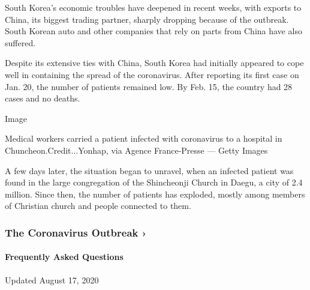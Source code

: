 South Korea's economic troubles have deepened in recent weeks, with
exports to China, its biggest trading partner, sharply dropping because
of the outbreak. South Korean auto and other companies that rely on
parts from China have also suffered.

Despite its extensive ties with China, South Korea had initially
appeared to cope well in containing the spread of the coronavirus. After
reporting its first case on Jan. 20, the number of patients remained
low. By Feb. 15, the country had 28 cases and no deaths.

Image

Medical workers carried a patient infected with coronavirus to a
hospital in Chuncheon.Credit...Yonhap, via Agence France-Presse ---
Getty Images

A few days later, the situation began to unravel, when an infected
patient was found in the large congregation of the Shincheonji Church in
Daegu, a city of 2.4 million. Since then, the number of patients has
exploded, mostly among members of Christian church and people connected
to them.

\href{https://www.nytimes.com/news-event/coronavirus?action=click\&pgtype=Article\&state=default\&region=MAIN_CONTENT_3\&context=storylines_faq}{}

\hypertarget{the-coronavirus-outbreak-}{%
\subsubsection{The Coronavirus Outbreak
›}\label{the-coronavirus-outbreak-}}

\hypertarget{frequently-asked-questions}{%
\paragraph{Frequently Asked
Questions}\label{frequently-asked-questions}}

Updated August 17, 2020

